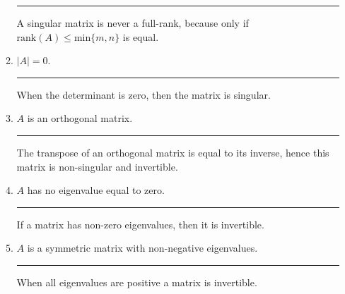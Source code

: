 \documentclass[12pt]{article}
\begin{document}
\begin{enumerate}
\begin{enumerate}
        \noindent\rule{\linewidth}{1pt}

        A singular matrix is never a full-rank, because only if $\textrm{rank}(A) \leq \textrm{min}\{m,n\}$ is equal.

        \item $|A| = 0$.
        
        \noindent\rule{\linewidth}{1pt}

        When the determinant is zero, then the matrix is singular.

        \item $A$ is an orthogonal matrix.
        
        \noindent\rule{\linewidth}{1pt} 
        
        The transpose of an orthogonal matrix is equal to its inverse, hence this matrix is non-singular and invertible.

        \item $A$ has no eigenvalue equal to zero.
        
        \noindent\rule{\linewidth}{1pt}

        If a matrix has non-zero eigenvalues, then it is invertible.

        \item $A$ is a symmetric matrix with non-negative eigenvalues.
        
        \noindent\rule{\linewidth}{1pt}

        When all eigenvalues are positive a matrix is invertible.

    \end{enumerate}
    
\end{enumerate}    
\end{document}
